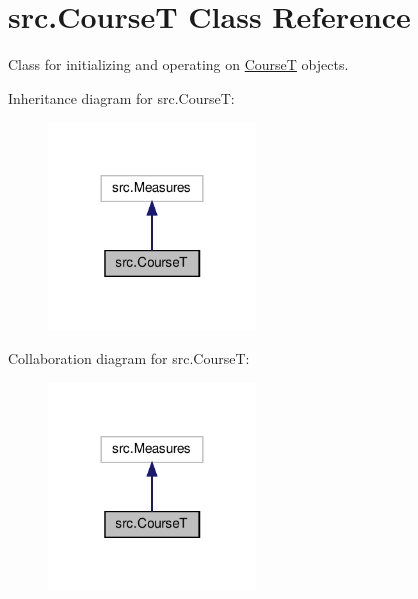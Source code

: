 \hypertarget{classsrc_1_1CourseT}{}\section{src.\+CourseT Class Reference}
\label{classsrc_1_1CourseT}


Class for initializing and operating on \hyperlink{classsrc_1_1CourseT}{CourseT} objects.  




Inheritance diagram for src.\+CourseT\+:
\nopagebreak
\begin{figure}[H]
\begin{center}
\leavevmode
\includegraphics[width=156pt]{classsrc_1_1CourseT__inherit__graph}
\end{center}
\end{figure}


Collaboration diagram for src.\+CourseT\+:
\nopagebreak
\begin{figure}[H]
\begin{center}
\leavevmode
\includegraphics[width=156pt]{classsrc_1_1CourseT__coll__graph}
\end{center}
\end{figure}

